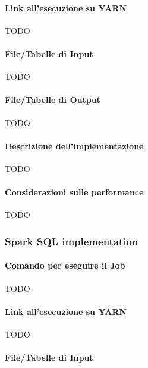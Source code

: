   \paragraph{Link all’esecuzione su YARN}\label{par:job1:mapreduce:yarn}

  TODO

  \paragraph{File/Tabelle di Input}\label{par:job1:mapreduce:input}

  TODO

  \paragraph{File/Tabelle di Output}\label{par:job1:mapreduce:output}

  TODO

  \paragraph{Descrizione dell’implementazione}\label{par:job1:mapreduce:implementation}

  TODO

  \paragraph{Considerazioni sulle performance}\label{par:job1:mapreduce:performance}

  TODO

  \subsubsection{Spark SQL implementation}\label{subsub:job1:spark}

  \paragraph{Comando per eseguire il Job}\label{par:job1:spark:cmd}

  TODO

  \paragraph{Link all’esecuzione su YARN}\label{par:job1:spark:yarn}

  TODO

  \paragraph{File/Tabelle di Input}\label{par:job1:spark:input}

